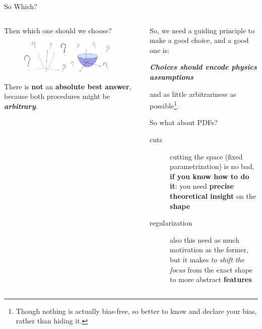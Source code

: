\documentclass[9pt]{beamer}
\begin{document}
\begin{frame}{So Which?}
    \vspace*{30pt}
    \begin{columns}
        \begin{column}{0.5\textwidth}
            Then which one should we choose?
            \vspace*{10pt}

            \begin{figure}
                \centering
                \includegraphics[width=0.9\textwidth]{choice}
            \end{figure}

            \vspace*{10pt}
            There is \textbf{not} an \alert{\textbf{absolute best answer}},
            because both procedures might be \textit{\textbf{arbitrary}}.
        \end{column}
        \begin{column}{0.5\textwidth}
            So, we need a guiding principle to make a good choice, and a good one is:
            \begin{center}
                \itshape
                \bfseries
                Choices should encode physics assumptions
            \end{center}
            and as little arbitrariness as possible\footnote{
                Though nothing is actually bias-free, so better to know and
                declare your bias, rather than hiding it.
            }.

            \vspace*{20pt}
            So what about PDFs?
            \begin{description}
                \item[cuts] cutting the space (fixed parametrization) is no
                    bad, \textbf{if you know how to do it}: you need
                    \alert{\textbf{precise theoretical insight}} on the
                    \alert{\textbf{\pdf shape}}
                \item[regularization] also this need as much motivation as the
                    former, but it makes \textit{to shift the focus} from the
                    exact shape to more abstract \alert{\textbf{features}}
            \end{description}
            \vspace*{20pt}
        \end{column}
    \end{columns}
\end{frame}
\end{document}
